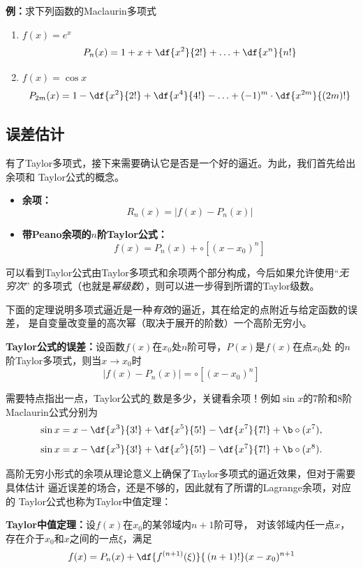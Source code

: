 {\bf 例：}求下列函数的Maclaurin多项式
\begin{enumerate}[(1)]
  \setlength{\itemindent}{1cm}
  \item $f(x)=e^x$ 
  $${P_n(x)=1+x+\df{x^2}{2!}+\ldots+\df{x^n}{n!}}$$ 
  \item $f(x)=\cos x$ 
  $${P_{2m}(x)=1-\df{x^2}{2!}+\df{x^4}{4!}-\ldots+(-1)^m\cdot\df{x^{2m}}{(2m)!}}$$
\end{enumerate}

\subsection{误差估计}

有了Taylor多项式，接下来需要确认它是否是一个好的逼近。为此，我们首先给出余项和
Taylor公式的概念。

\begin{thx}
	\begin{itemize}
	  \item {\bf 余项：}
	  $$R_n(x)=|f(x)-P_n(x)|$$ 
	  \item {\bf 带Peano余项的$n$阶Taylor公式：}
	  $$f(x)=P_n(x)+\circ[(x-x_0)^n]$$
	\end{itemize}
\end{thx}

可以看到Taylor公式由Taylor多项式和余项两个部分构成，今后如果允许使用“{\it 无穷次}”
的多项式（也就是{\it 幂级数}），则可以进一步得到所谓的{\kaishu Taylor级数}。


下面的定理说明多项式逼近是一种{\it 有效}的逼近，其在给定的点附近与给定函数的误差，
是自变量改变量的高次幂（取决于展开的阶数）一个高阶无穷小。

\begin{thx}
	{\bf Taylor公式的误差：}设函数$f(x)$在$x_0$处$n$阶可导，$P(x)$是$f(x)$在点$x_0$处
	的$n$阶Taylor多项式，则当$x\to x_0$时
	$${|f(x)-P_n(x)|=\circ[(x-x_0)^n]}$$
\end{thx}

需要特点指出一点，Taylor公式的{\b 阶数是多少，关键看余项！}例如$\sin x$的7阶和8阶Maclaurin公式分别为
$$\sin x=x-\df{x^3}{3!}+\df{x^5}{5!}-\df{x^7}{7!}+{\b\circ(x^7)},$$
$$\sin x=x-\df{x^3}{3!}+\df{x^5}{5!}-\df{x^7}{7!}+{\b\circ(x^8)}.$$

高阶无穷小形式的余项从理论意义上确保了Taylor多项式的逼近效果，但对于需要具体估计
逼近误差的场合，还是不够的，因此就有了所谓的{\kaishu Lagrange余项}，对应的
Taylor公式也称为Taylor中值定理：

\begin{thx}
	{\bf Taylor中值定理：}设$f(x)$在$x_0$的某邻域内$n+1$阶可导，
	对该邻域内任一点$x$，存在介于$x_0$和$x$之间的一点$\xi$，满足
	$$f(x)=P_n(x)+\df{f^{(n+1)}(\xi)}{\,(n+1)!}(x-x_0)^{n+1}$$
\end{thx}

